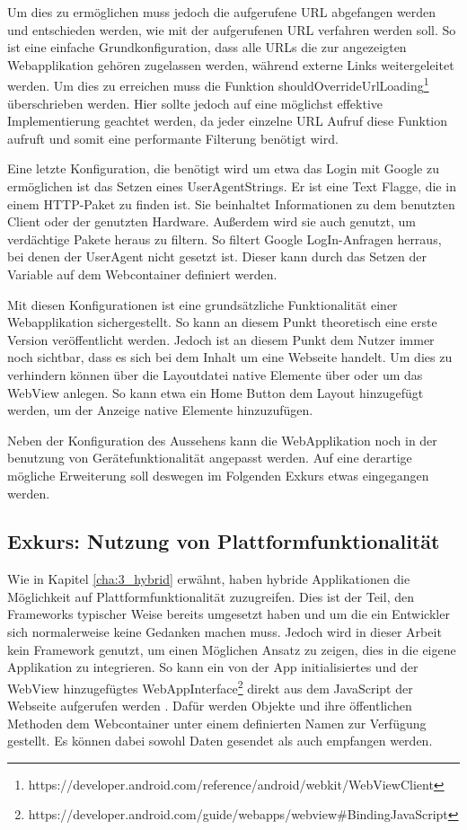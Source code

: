 Um dies zu ermöglichen muss jedoch die aufgerufene URL abgefangen werden und entschieden werden, wie mit der aufgerufenen URL verfahren werden soll. So ist eine einfache Grundkonfiguration, dass alle URLs die zur angezeigten Webapplikation gehören zugelassen werden, während externe Links weitergeleitet werden. Um dies zu erreichen muss die Funktion shouldOverrideUrlLoading\footnote{https://developer.android.com/reference/android/webkit/WebViewClient} überschrieben werden. Hier sollte jedoch auf eine möglichst effektive Implementierung geachtet werden, da jeder einzelne URL Aufruf diese Funktion aufruft und somit eine performante Filterung benötigt wird.

Eine letzte Konfiguration, die benötigt wird um etwa das Login mit Google zu ermöglichen ist das Setzen eines UserAgentStrings. Er ist eine Text Flagge, die in einem HTTP-Paket zu finden ist. Sie beinhaltet Informationen zu dem benutzten Client oder der genutzten Hardware. Außerdem wird sie auch genutzt, um verdächtige Pakete heraus zu filtern\cite{UserAgentString}. So filtert Google LogIn-Anfragen herraus, bei denen der UserAgent nicht gesetzt ist. Dieser kann durch das Setzen der Variable auf dem Webcontainer definiert werden.

Mit diesen Konfigurationen ist eine grundsätzliche Funktionalität einer Webapplikation sichergestellt. So kann an diesem Punkt theoretisch eine erste Version veröffentlicht werden. Jedoch ist an diesem Punkt dem Nutzer immer noch sichtbar, dass es sich bei dem Inhalt um eine Webseite handelt. Um dies zu verhindern können über die Layoutdatei native Elemente über oder um das WebView anlegen. So kann etwa ein Home Button dem Layout hinzugefügt werden, um der Anzeige native Elemente hinzuzufügen.

Neben der Konfiguration des Aussehens kann die WebApplikation noch in der benutzung von Gerätefunktionalität angepasst werden. Auf eine derartige mögliche Erweiterung soll deswegen im Folgenden Exkurs etwas eingegangen werden.

\subsection{Exkurs: Nutzung von Plattformfunktionalität}
Wie in Kapitel \ref{cha:3_hybrid} erwähnt, haben hybride Applikationen die Möglichkeit auf Plattformfunktionalität zuzugreifen. Dies ist der Teil, den Frameworks typischer Weise bereits umgesetzt haben und um die ein Entwickler sich normalerweise keine Gedanken machen muss. Jedoch wird in dieser Arbeit kein Framework genutzt, um einen Möglichen Ansatz zu zeigen, dies in die eigene Applikation zu integrieren. So kann ein von der App initialisiertes und der WebView hinzugefügtes WebAppInterface\footnote{https://developer.android.com/guide/webapps/webview\#BindingJavaScript} direkt aus dem JavaScript der Webseite aufgerufen werden \cite{webview_javascript_security}. Dafür werden Objekte und ihre öffentlichen Methoden dem Webcontainer unter einem definierten Namen zur Verfügung gestellt. Es können dabei sowohl Daten gesendet als auch empfangen werden.

